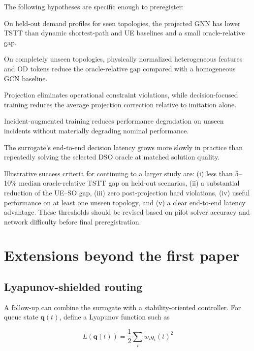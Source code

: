 \documentclass[11pt]{article}
\newcommand{\vect}[1]{\bm{#1}}
\begin{document}
The following hypotheses are specific enough to preregister:

\begin{description}[leftmargin=1.6in,style=nextline]
  \item[H1: decision quality]
  On held-out demand profiles for seen topologies, the projected GNN has lower TSTT than
  dynamic shortest-path and UE baselines and a small oracle-relative gap.
  \item[H2: topology transfer]
  On completely unseen topologies, physically normalized heterogeneous features and OD
  tokens reduce the oracle-relative gap compared with a homogeneous GCN baseline.
  \item[H3: feasibility]
  Projection eliminates operational constraint violations, while decision-focused
  training reduces the average projection correction relative to imitation alone.
  \item[H4: robustness]
  Incident-augmented training reduces performance degradation on unseen incidents
  without materially degrading nominal performance.
  \item[H5: computational value]
  The surrogate's end-to-end decision latency grows more slowly in practice than
  repeatedly solving the selected DSO oracle at matched solution quality.
\end{description}

Illustrative success criteria for continuing to a larger study are: (i) less than
5--10\% median oracle-relative TSTT gap on held-out scenarios, (ii) a substantial
reduction of the UE--SO gap, (iii) zero post-projection hard violations, (iv) useful
performance on at least one unseen topology, and (v) a clear end-to-end latency
advantage.  These thresholds should be revised based on pilot solver accuracy and
network difficulty before final preregistration.

\section{Extensions beyond the first paper}

\subsection{Lyapunov-shielded routing}

A follow-up can combine the surrogate with a stability-oriented controller.  For queue
state \(\vect{q}(t)\), define a Lyapunov function such as

\begin{equation}
  L(\vect{q}(t)) = \frac{1}{2}\sum_i w_i q_i(t)^2
\end{equation}
\end{document}
